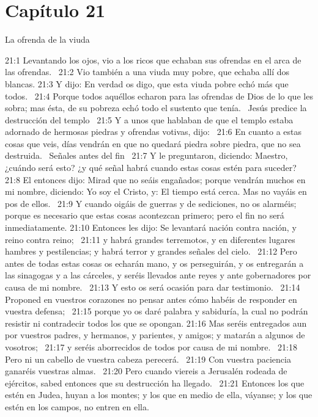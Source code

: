 \section*{Capítulo 21}
La ofrenda de la viuda   

21:1 Levantando los ojos, vio a los ricos que echaban sus ofrendas en el arca de las ofrendas.  
21:2 Vio también a una viuda muy pobre, que echaba allí dos blancas. 
21:3 Y dijo: En verdad os digo, que esta viuda pobre echó más que todos.  
21:4 Porque todos aquéllos echaron para las ofrendas de Dios de lo que les sobra; mas ésta, de su pobreza echó todo el sustento que tenía.  
Jesús predice la destrucción del templo   
21:5 Y a unos que hablaban de que el templo estaba adornado de hermosas piedras y ofrendas votivas, dijo:  
21:6 En cuanto a estas cosas que veis, días vendrán en que no quedará piedra sobre piedra, que no sea destruida.  
Señales antes del fin   
21:7 Y le preguntaron, diciendo: Maestro, ¿cuándo será esto? ¿y qué señal habrá cuando estas cosas estén para suceder?  
21:8 El entonces dijo: Mirad que no seáis engañados; porque vendrán muchos en mi nombre, diciendo: Yo soy el Cristo, y: El tiempo está cerca. Mas no vayáis en pos de ellos.  
21:9 Y cuando oigáis de guerras y de sediciones, no os alarméis; porque es necesario que estas cosas acontezcan primero; pero el fin no será inmediatamente. 
21:10 Entonces les dijo: Se levantará nación contra nación, y reino contra reino;  
21:11 y habrá grandes terremotos, y en diferentes lugares hambres y pestilencias; y habrá terror y grandes señales del cielo.  
21:12 Pero antes de todas estas cosas os echarán mano, y os perseguirán, y os entregarán a las sinagogas y a las cárceles, y seréis llevados ante reyes y ante gobernadores por causa de mi nombre.  
21:13 Y esto os será ocasión para dar testimonio.  
21:14 Proponed en vuestros corazones no pensar antes cómo habéis de responder en vuestra defensa;  
21:15 porque yo os daré palabra y sabiduría, la cual no podrán resistir ni contradecir todos los que se opongan. 
21:16 Mas seréis entregados aun por vuestros padres, y hermanos, y parientes, y amigos; y matarán a algunos de vosotros;  
21:17 y seréis aborrecidos de todos por causa de mi nombre.  
21:18 Pero ni un cabello de vuestra cabeza perecerá.  
21:19 Con vuestra paciencia ganaréis vuestras almas.  
21:20 Pero cuando viereis a Jerusalén rodeada de ejércitos, sabed entonces que su destrucción ha llegado.  
21:21 Entonces los que estén en Judea, huyan a los montes; y los que en medio de ella, váyanse; y los que estén en los campos, no entren en ella.  
